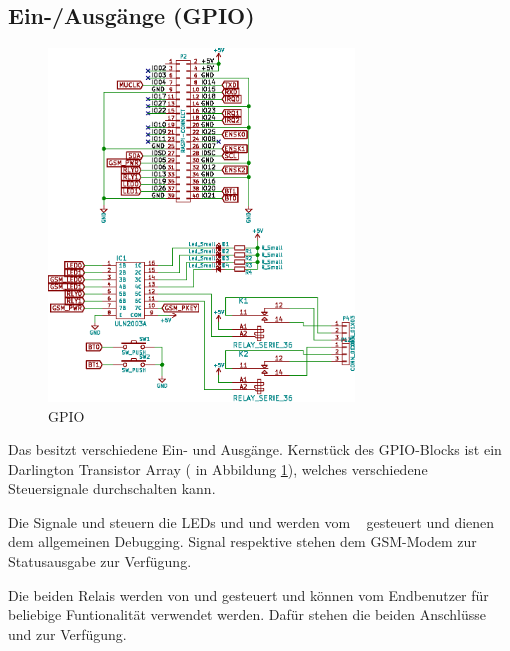 

\clearpage
\subsection{Ein-/Ausg\"ange (GPIO)}
\label{subsec:hw:master:gpio}

\begin{figure}[h!t]
    \centering
    \includegraphics[width=0.725\textwidth]{images/superv-sch/supervisor--sch--gpio.eps}
    \caption{GPIO \Master}
    \label{fig:sch:master:gpio}
\end{figure}


Das  \Master   besitzt  verschiedene  Ein-  und   Ausg\"ange. Kernst\"uck  des
GPIO-Blocks  ist  ein Darlington  Transistor  Array  ( in  Abbildung
\ref{fig:sch:master:gpio}),  welches verschiedene  Steuersignale durchschalten
kann.

Die  Signale    und   steuern  die  LEDs    und
  und  werden  vom  \Raspi~  gesteuert  und  dienen  dem  allgemeinen
Debugging. Signal    respektive    stehen  dem
GSM-Modem zur Statusausgabe zur Verf\"ugung.

Die   beiden  Relais   werden  von     und     gesteuert
und  k\"onnen  vom  Endbenutzer   f\"ur  beliebige  Funtionalit\"at  verwendet
werden. Daf\"ur stehen  die beiden  Anschl\"usse  und   zur
Verf\"ugung.

